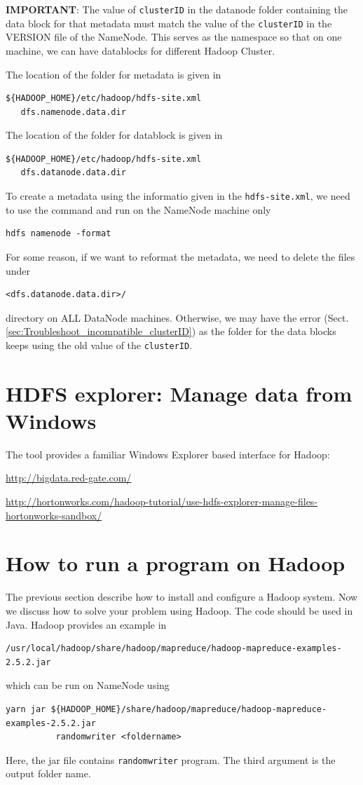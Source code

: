 {\bf IMPORTANT}: The value of \verb!clusterID! in the datanode folder containing
the data block for that metadata must match the value of the \verb!clusterID! in
the VERSION file of the NameNode. This serves as the namespace so that on one
machine, we can have datablocks for different Hadoop Cluster. 

The location of the folder for metadata is given in 
\begin{verbatim}
${HADOOP_HOME}/etc/hadoop/hdfs-site.xml
   dfs.namenode.data.dir
\end{verbatim}

The location of the folder for datablock is given in 
\begin{verbatim}
${HADOOP_HOME}/etc/hadoop/hdfs-site.xml
   dfs.datanode.data.dir
\end{verbatim}

To create a metadata using the informatio given in the \verb!hdfs-site.xml!, we
need to use the command and run on the NameNode machine only
\begin{verbatim}
hdfs namenode -format
\end{verbatim}
For some reason, if we want to reformat the metadata, we need to delete the
files under
\begin{verbatim}
<dfs.datanode.data.dir>/
\end{verbatim}
directory on ALL DataNode machines. Otherwise, we may have the error
(Sect.\ref{sec:Troubleshoot_incompatible_clusterID}) as the folder for the data
blocks keeps using the old value of the \verb!clusterID!.  

\section{HDFS explorer: Manage data from Windows}

The tool provides a familiar Windows Explorer based 
interface for Hadoop:

\url{http://bigdata.red-gate.com/}

\url{http://hortonworks.com/hadoop-tutorial/use-hdfs-explorer-manage-files-hortonworks-sandbox/}


\section{How to run a program on Hadoop}

The previous section describe how to install and configure a Hadoop system. Now
we discuss how to solve your problem using Hadoop. The code should be used in
Java. Hadoop provides an example in 
\begin{verbatim}
/usr/local/hadoop/share/hadoop/mapreduce/hadoop-mapreduce-examples-2.5.2.jar
\end{verbatim}
which can be run on NameNode using
{\small
\begin{verbatim}
yarn jar ${HADOOP_HOME}/share/hadoop/mapreduce/hadoop-mapreduce-examples-2.5.2.jar
          randomwriter <foldername>
\end{verbatim}
}
Here, the jar file contains \verb!randomwriter! program. The third argument is
the output folder name. 

